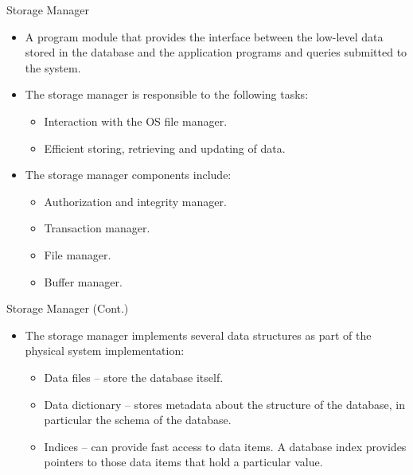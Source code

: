 \documentclass{beamer}
\begin{document}
\begin{frame}{Storage Manager}
    \begin{itemize}
        \item A program module that provides the interface between the low-level data stored in the database and the application programs and queries submitted to the system.
        \item The storage manager is responsible to the following tasks: 
        \begin{itemize}
            \item Interaction with the OS file manager.
            \item Efficient storing, retrieving and updating of data.
        \end{itemize}
        \item The storage manager components include:
        \begin{itemize}
            \item Authorization and integrity manager.
            \item Transaction manager.
            \item File manager.
            \item Buffer manager.
        \end{itemize}
    \end{itemize}
\end{frame}

\begin{frame}{Storage Manager (Cont.)}
    \begin{itemize}
        \item The storage manager implements several data structures as part of the physical system implementation:
        \begin{itemize}
            \item Data files -- store the database itself.
            \item Data dictionary --  stores metadata about the structure of the database, in particular the schema of the database.
            \item Indices --  can provide fast access to data items.  A database index provides pointers to those data items that hold a particular value.
        \end{itemize}
    \end{itemize}
\end{frame}
\end{document}
